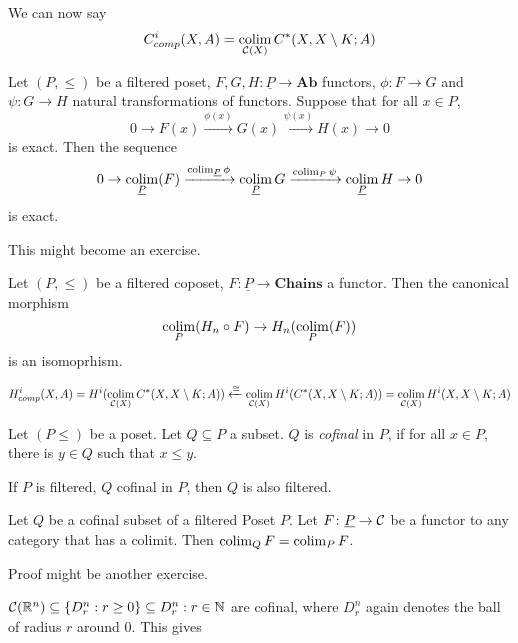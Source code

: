 \documentclass[language=english]{TemplateLecture}
\begin{document}
\begin{excursion}
\begin{example}
        We can now say
        \[C_{comp}^i(X,A) = \operatorname*{\mathrm{colim}}_{\mathcal{C}(X)} C^*(X, X\setminus K; A)\]
    \end{example}

    \begin{Proposition}
        Let \((P, \leq)\) be a filtered poset, \(F,G,H \colon \underline{P} \to \mathbf{Ab}\) functors, \(\phi\colon F \to G\) and \(\psi\colon G \to H\) natural transformations of functors. Suppose that for all \(x \in P\),
        \[0 \to F(x) \xrightarrow{\phi(x)} G(x) \xrightarrow{\psi(x)} H(x) \to 0\]
        is exact. Then the sequence
        \[0 \to \operatorname*{\mathrm{colim}}_{\underline P}(F) \xrightarrow{\operatorname*{\mathrm{colim}}_{\underline P} \phi} \operatorname*{\mathrm{colim}}_{\underline P} G \xrightarrow{\operatorname*{\mathrm{colim}}_P \psi} \operatorname*{\mathrm{colim}}_{\underline P} H \to 0\]
        is exact.
    \end{Proposition}

    This might become an exercise.

    \begin{corollary}
        Let \((P, \leq)\) be a filtered coposet, \(F\colon \underline P \to \mathbf{Chains}\) a functor. Then the canonical morphism
        \[\operatorname*{\mathrm{colim}}_P(H_n \circ F) \to H_n(\operatorname*{\mathrm{colim}}_P(F))\]
        is an isomoprhism.
    \end{corollary}

    \begin{corollary}
        \[H^i_{comp}(X,A) = H^i(\operatorname*{\mathrm{colim}}_{\mathcal{C}(X)} C^*(X, X\setminus K; A)) \xleftarrow{\cong} \operatorname*{\mathrm{colim}}_{\mathcal{C}(X)} H^i(C^*(X,X\setminus K; A)) = \operatorname*{\mathrm{colim}}_{\mathcal{C}(X)} H^i(X, X\setminus K;A)\]
    \end{corollary}

    \begin{Definition}
        Let \((P \leq)\) be a poset. Let \(Q \subseteq P\) a subset. \(Q\) is \emph{cofinal} in \(P\), if for all \(x \in P\), there is \(y \in Q\) such that \(x \leq y\).
    \end{Definition}

    If \(P\) is filtered, \(Q\) cofinal in \(P\), then \(Q\) is also filtered.

    \begin{Proposition}
        Let \(Q\) be a cofinal subset of a filtered Poset \(P\). Let \(F\colon \underline P \to \mathcal{C}\) be a functor to any category that has a colimit. Then \(\operatorname*{\mathrm{colim}}_Q F = \operatorname*{\mathrm{colim}}_P F\).
    \end{Proposition}
    Proof might be another exercise.

    \begin{example}
        \(\mathcal{C}(\mathbb{R}^n) \subseteq \{D_r^n : r\geq 0\} \subseteq {D_r^n : r \in \mathbb{N}}\) are cofinal, where \(D_r^n\) again denotes the ball of radius \(r\) around \(0\). This gives


\end{example}
\end{excursion}
\end{document}

